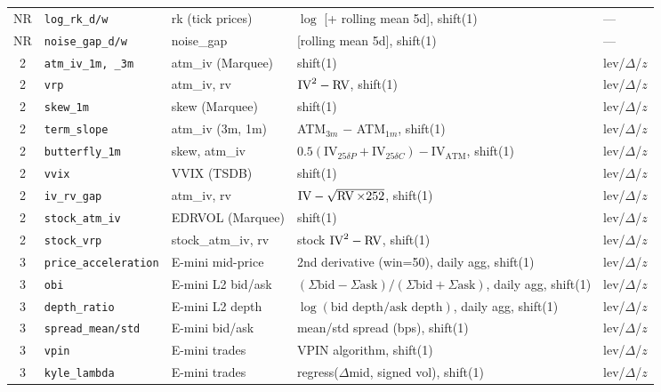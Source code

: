 {\begin{longtable}{@{}cl p{2.4cm} p{4.6cm} l@{}}
NR & \texttt{log\_rk\_d/w} & rk (tick prices) & $\log$ [+ rolling mean 5d], shift(1) & --- \\
NR & \texttt{noise\_gap\_d/w} & noise\_gap & [rolling mean 5d], shift(1) & --- \\
\midrule

2 & \texttt{atm\_iv\_1m, \_3m} & atm\_iv (Marquee) & shift(1) & lev/$\Delta$/$z$ \\
2 & \texttt{vrp} & atm\_iv, rv & $\text{IV}^2 - \operatorname{RV}$, shift(1) & lev/$\Delta$/$z$ \\
2 & \texttt{skew\_1m} & skew (Marquee) & shift(1) & lev/$\Delta$/$z$ \\
2 & \texttt{term\_slope} & atm\_iv (3m, 1m) & ATM$_{3m}$ $-$ ATM$_{1m}$, shift(1) & lev/$\Delta$/$z$ \\
2 & \texttt{butterfly\_1m} & skew, atm\_iv & $0.5(\text{IV}_{25\delta P} {+} \text{IV}_{25\delta C}) {-} \text{IV}_{\text{ATM}}$, shift(1) & lev/$\Delta$/$z$ \\
2 & \texttt{vvix} & VVIX (TSDB) & shift(1) & lev/$\Delta$/$z$ \\
2 & \texttt{iv\_rv\_gap} & atm\_iv, rv & $\text{IV} - \sqrt{\operatorname{RV} \times 252}$, shift(1) & lev/$\Delta$/$z$ \\
2 & \texttt{stock\_atm\_iv} & EDRVOL (Marquee) & shift(1) & lev/$\Delta$/$z$ \\
2 & \texttt{stock\_vrp} & stock\_atm\_iv, rv & stock $\text{IV}^2 - \operatorname{RV}$, shift(1) & lev/$\Delta$/$z$ \\
\midrule

3 & \texttt{price\_acceleration} & E-mini mid-price & 2nd derivative (win=50), daily agg, shift(1) & lev/$\Delta$/$z$ \\
3 & \texttt{obi} & E-mini L2 bid/ask & $(\Sigma\text{bid} {-} \Sigma\text{ask})/(\Sigma\text{bid} {+} \Sigma\text{ask})$, daily agg, shift(1) & lev/$\Delta$/$z$ \\
3 & \texttt{depth\_ratio} & E-mini L2 depth & $\log(\text{bid depth}/\text{ask depth})$, daily agg, shift(1) & lev/$\Delta$/$z$ \\
3 & \texttt{spread\_mean/std} & E-mini bid/ask & mean/std spread (bps), shift(1) & lev/$\Delta$/$z$ \\
3 & \texttt{vpin} & E-mini trades & VPIN algorithm, shift(1) & lev/$\Delta$/$z$ \\
3 & \texttt{kyle\_lambda} & E-mini trades & regress($\Delta$mid, signed vol), shift(1) & lev/$\Delta$/$z$ \\
\midrule


\end{longtable}}
